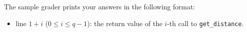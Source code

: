 The sample grader prints your answers in the following format:
\begin{itemize}
\item line $1 + i$ ($0 \leq i \leq q - 1$): the return value of the $i$-th call to \texttt{get\_distance}.
\end{itemize}
